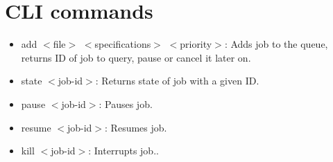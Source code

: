 \section{CLI commands}
\begin{itemize}
\item add $<$file$>$ $<$specifications$>$ $<$priority$>$: Adds job to the queue, returns ID of job to query, pause or cancel it later on.
\item state $<$job-id$>$: Returns state of job with a given ID.
\item pause $<$job-id$>$: Pauses job.
\item resume $<$job-id$>$: Resumes job.
\item kill $<$job-id$>$: Interrupts job..
\end{itemize}
